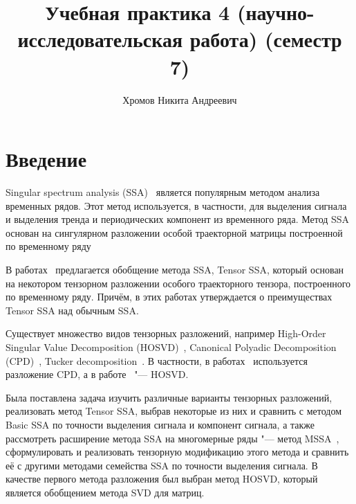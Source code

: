 \documentclass[specialist,
    substylefile = spbu_report.rtx,
    subf,href,colorlinks=true, 12pt]{disser}
\theoremstyle{plain}
\theoremstyle{definition}
\theoremstyle{remark}
\begin{document}
    \title{Учебная практика 4 (научно-исследовательская работа) (семестр 7)}
    \author{Хромов Никита Андреевич}
    \date{\number\year}
    \maketitle

    \tableofcontents


    \section{Введение}\label{sec:intro}
    Singular spectrum analysis (SSA)~\cite{ssa} является популярным методом анализа временных рядов.
    Этот метод используется, в частности, для выделения сигнала и выделения тренда и периодических компонент из временного ряда.
    Метод SSA основан на сингулярном разложении особой траекторной матрицы построенной по временному ряду

    В работах~\cite{TSSA, TSSA-improved, hosvd-hooi-separation} предлагается обобщение метода SSA, Tensor SSA, который основан на некотором
    тензорном разложении особого траекторного тензора, построенного по временному ряду.
    Причём, в этих работах утверждается о преимуществах Tensor SSA над обычным SSA\@.

    Существует множество видов тензорных разложений, например High-Order Singular Value Decomposition (HOSVD)~\cite{hosvd},
    Canonical Polyadic Decomposition (CPD)~\cite{parafac1, parafac2}, Tucker decomposition~\cite{tucker}.
    В частности, в работах~\cite{TSSA, TSSA-improved} используется разложение CPD, а в
    работе~\cite{hosvd-hooi-separation} "--- HOSVD\@.

    Была поставлена задача изучить различные варианты тензорных разложений, реализовать метод Tensor SSA, выбрав некоторые из них
    и сравнить с методом Basic SSA по точности выделения сигнала и компонент сигнала, а также
    рассмотреть расширение метода SSA на многомерные ряды "--- метод MSSA~\cite{ssa-2020},
    сформулировать и реализовать тензорную модификацию этого метода и сравнить её с другими методами
    семейства SSA по точности выделения сигнала.
    В качестве первого метода разложения был выбран метод HOSVD, который является обобщением метода SVD для матриц.
\end{document}

